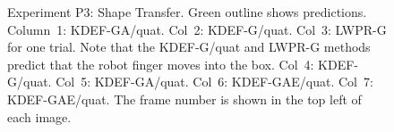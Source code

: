 \begin{figure}[tbp]
\caption {Experiment P3: Shape Transfer. Green outline shows predictions. Column~1: KDEF-GA/quat.
  Col~2: KDEF-G/quat. Col~3: LWPR-G for one trial.  Note that the
  KDEF-G/quat and LWPR-G methods predict that the robot finger moves
  into the box.  Col~4: KDEF-G/quat. Col~5: KDEF-GA/quat. Col~6:
  KDEF-GAE/quat. Col~7: KDEF-GAE/quat. The frame number is shown in
  the top left of each image.  }
\label{fig:ExperimentStransfer}
\end{figure}

